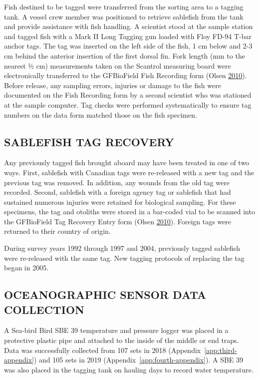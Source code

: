 \documentclass[12pt]{article}\usepackage[]{graphicx}\usepackage[]{color}
\begin{document}
Fish destined to be tagged were transferred from the sorting area to a tagging tank. A vessel crew member was positioned to retrieve sablefish from the tank and provide assistance with fish handling. A scientist stood at the sample station and tagged fish with a Mark II Long Tagging gun loaded with Floy FD-94 T-bar anchor tags. The tag was inserted on the left side of the fish, 1 cm below and 2-3 cm behind the anterior insertion of the first dorsal fin. Fork length (mm to the nearest ½ cm) measurements taken on the Scantrol measuring board were electronically transferred to the GFBioField Fish Recording form (Olsen \protect\hyperlink{ref-Olsen2010}{2010}). Before release, any sampling errors, injuries or damage to the fish were documented on the Fish Recording form by a second scientist who was stationed at the sample computer. Tag checks were performed systematically to ensure tag numbers on the data form matched those on the fish specimen.

\hypertarget{sablefish-tag-recovery}{%
\subsection{SABLEFISH TAG RECOVERY}\label{sablefish-tag-recovery}}

Any previously tagged fish brought aboard may have been treated in one of two ways. First, sablefish with Canadian tags were re-released with a new tag and the previous tag was removed. In addition, any wounds from the old tag were recorded. Second, sablefish with a foreign agency tag or sablefish that had sustained numerous injuries were retained for biological sampling. For these specimens, the tag and otoliths were stored in a bar-coded vial to be scanned into the GFBioField Tag Recovery Entry form (Olsen \protect\hyperlink{ref-Olsen2010}{2010}). Foreign tags were returned to their country of origin.

During survey years 1992 through 1997 and 2004, previously tagged sablefish were re-released with the same tag. New tagging protocols of replacing the tag began in 2005.

\hypertarget{oceanographic-sensor-data-collection}{%
\subsection{OCEANOGRAPHIC SENSOR DATA COLLECTION}\label{oceanographic-sensor-data-collection}}

A Sea-bird Bird SBE 39 temperature and pressure logger was placed in a protective plastic pipe and attached to the inside of the middle or end traps. Data was successfully collected from 107 sets in 2018 (Appendix~\ref{app:third-appendix}) and 105 sets in 2019 (Appendix~\ref{app:fourth-appendix}). A SBE 39 was also placed in the tagging tank on hauling days to record water temperature.
\end{document}
